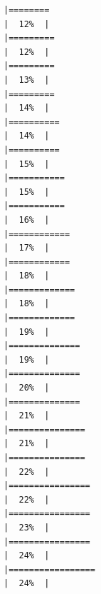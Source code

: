 \documentclass[
  english,
  man,a4paper,mask,floatsintext]{apa6}
\begin{document}
\begin{verbatim}
|========                                                              |  12%  |                                                                              |=========                                                             |  12%  |                                                                              |=========                                                             |  13%  |                                                                              |=========                                                             |  14%  |                                                                              |==========                                                            |  14%  |                                                                              |==========                                                            |  15%  |                                                                              |===========                                                           |  15%  |                                                                              |===========                                                           |  16%  |                                                                              |============                                                          |  17%  |                                                                              |============                                                          |  18%  |                                                                              |=============                                                         |  18%  |                                                                              |=============                                                         |  19%  |                                                                              |==============                                                        |  19%  |                                                                              |==============                                                        |  20%  |                                                                              |==============                                                        |  21%  |                                                                              |===============                                                       |  21%  |                                                                              |===============                                                       |  22%  |                                                                              |================                                                      |  22%  |                                                                              |================                                                      |  23%  |                                                                              |================                                                      |  24%  |                                                                              |=================                                                     |  24%  |                                                                              
\end{verbatim}
\end{document}
